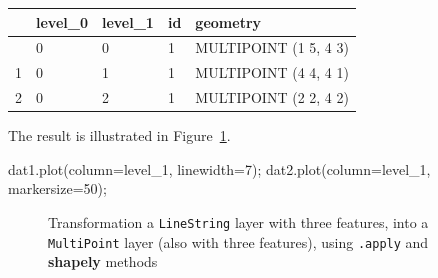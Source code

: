 \documentclass[
  letterpaper,
]{krantz}
\newenvironment{Shaded}{\begin{snugshade}}{\end{snugshade}}
\newcommand{\DecValTok}[1]{\textcolor[rgb]{0.68,0.00,0.00}{#1}}
\newcommand{\NormalTok}[1]{\textcolor[rgb]{0.00,0.23,0.31}{#1}}
\newcommand{\OperatorTok}[1]{\textcolor[rgb]{0.37,0.37,0.37}{#1}}
\newcommand{\StringTok}[1]{\textcolor[rgb]{0.13,0.47,0.30}{#1}}
\begin{document}
\begin{longtable}[]{@{}lllll@{}}
\toprule\noalign{}
& level\_0 & level\_1 & id & geometry \\
\midrule\noalign{}
\endhead
\bottomrule\noalign{}
\endlastfoot
0 & 0 & 0 & 1 & MULTIPOINT (1 5, 4 3) \\
1 & 0 & 1 & 1 & MULTIPOINT (4 4, 4 1) \\
2 & 0 & 2 & 1 & MULTIPOINT (2 2, 4 2) \\
\end{longtable}

The result is illustrated in Figure~\ref{fig-linestring-to-multipoint}.

\begin{Shaded}
\begin{Highlighting}[]
\NormalTok{dat1.plot(column}\OperatorTok{=}\StringTok{\textquotesingle{}level\_1\textquotesingle{}}\NormalTok{, linewidth}\OperatorTok{=}\DecValTok{7}\NormalTok{)}\OperatorTok{;}
\NormalTok{dat2.plot(column}\OperatorTok{=}\StringTok{\textquotesingle{}level\_1\textquotesingle{}}\NormalTok{, markersize}\OperatorTok{=}\DecValTok{50}\NormalTok{)}\OperatorTok{;}
\end{Highlighting}
\end{Shaded}

\begin{figure}

\begin{minipage}{0.50\linewidth}



\end{minipage}%
%
\begin{minipage}{0.50\linewidth}



\end{minipage}%

\caption{\label{fig-linestring-to-multipoint}Transformation a
\texttt{\textquotesingle{}LineString\textquotesingle{}} layer with three
features, into a \texttt{\textquotesingle{}MultiPoint\textquotesingle{}}
layer (also with three features), using \texttt{.apply} and
\textbf{shapely} methods}

\end{figure}%
\end{document}
